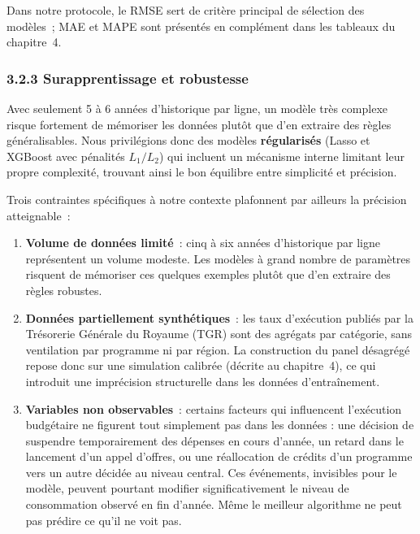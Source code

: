 Dans notre protocole, le RMSE sert de critère principal de sélection des modèles~;
MAE et MAPE sont présentés en complément dans les tableaux du chapitre~4.

\subsubsection*{3.2.3 \quad Surapprentissage et robustesse}

Avec seulement 5 à 6 années d'historique par ligne, un modèle très complexe risque
fortement de mémoriser les données plutôt que d'en extraire des règles généralisables.
Nous privilégions donc des modèles \textbf{régularisés} (Lasso et XGBoost avec
pénalités $L_1/L_2$) qui incluent un mécanisme interne limitant leur propre
complexité, trouvant ainsi le bon équilibre entre simplicité et précision.

Trois contraintes spécifiques à notre contexte plafonnent par ailleurs la précision
atteignable~:

\begin{enumerate}
    \item \textbf{Volume de données limité}~: cinq à six années d'historique par ligne
    représentent un volume modeste. Les modèles à grand nombre de paramètres risquent
    de mémoriser ces quelques exemples plutôt que d'en extraire des règles robustes.

    \item \textbf{Données partiellement synthétiques}~: les taux d'exécution publiés
    par la Trésorerie Générale du Royaume (TGR) sont des agrégats par catégorie, sans
    ventilation par programme ni par région. La construction du panel désagrégé repose
    donc sur une simulation calibrée (décrite au chapitre~4), ce qui introduit une
    imprécision structurelle dans les données d'entraînement.

    \item \textbf{Variables non observables}~: certains facteurs qui influencent
    l'exécution budgétaire ne figurent tout simplement pas dans les données : une
    décision de suspendre temporairement des dépenses en cours d'année, un retard
    dans le lancement d'un appel d'offres, ou une réallocation de crédits d'un
    programme vers un autre décidée au niveau central. Ces événements, invisibles
    pour le modèle, peuvent pourtant modifier significativement le niveau de
    consommation observé en fin d'année. Même le meilleur algorithme ne peut pas
    prédire ce qu'il ne voit pas.
\end{enumerate}

